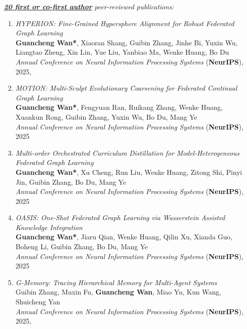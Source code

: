 {\textit{\underline{\textbf{20 \color{gray} first or co-first author}} \color{gray} peer-reviewed publications:}}

\begin{enumerate}
    \item \textit{HYPERION: Fine-Grained Hypersphere Alignment for Robust Federated Graph Learning} \\
    \textbf{Guancheng Wan*}, Xiaoran Shang, Guibin Zhang, Jinhe Bi, Yuxin Wu, Liangtao Zheng, Xin Lin, Yue Liu, Yanbiao Ma, Wenke Huang, Bo Du \\
    \hfill \textit{Annual Conference on Neural Information Processing Systems} (\textbf{NeurIPS}), 2025, {}

    \item \textit{MOTION: Multi-Sculpt Evolutionary Coarsening for Federated Continual Graph Learning} \\
    \textbf{Guancheng Wan*}, Fengyuan Ran, Ruikang Zhang, Wenke Huang, Xuankun Rong, Guibin Zhang, Yuxin Wu, Bo Du, Mang Ye \\
    \hfill \textit{Annual Conference on Neural Information Processing Systems} (\textbf{NeurIPS}), 2025

    \item \textit{Multi-order Orchestrated Curriculum Distillation for Model-Heterogeneous Federated Graph Learning} \\
    \textbf{Guancheng Wan*}, Xu Cheng, Run Liu, Wenke Huang, Zitong Shi, Pinyi Jin, Guibin Zhang, Bo Du, Mang Ye \\
    \hfill \textit{Annual Conference on Neural Information Processing Systems} (\textbf{NeurIPS}), 2025

    \item \textit{OASIS: One-Shot Federated Graph Learning via Wasserstein Assisted Knowledge Integration} \\
    \textbf{Guancheng Wan*}, Jiaru Qian, Wenke Huang, Qilin Xu, Xianda Guo, Boheng Li, Guibin Zhang, Bo Du, Mang Ye \\
    \hfill \textit{Annual Conference on Neural Information Processing Systems} (\textbf{NeurIPS}), 2025
    
    \item \textit{G-Memory: Tracing Hierarchical Memory for Multi-Agent Systems} \\
    Guibin Zhang, Muxin Fu, \textbf{Guancheng Wan}, Miao Yu, Kun Wang, Shuicheng Yan \\
    \hfill \textit{Annual Conference on Neural Information Processing Systems} (\textbf{NeurIPS}), 2025, {}


\end{enumerate}
